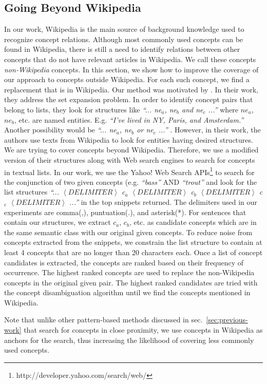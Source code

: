 
\subsection{Going Beyond Wikipedia}
\label{sec:impr-syst-cover}
In our work, Wikipedia is the main source of background knowledge used
to recognize concept relations. Although most commonly used concepts
can be found in Wikipedia, there is still a need to identify relations
between other concepts that do not have relevant articles in
Wikipedia. We call these concepts {\em non-Wikipedia} concepts.  In
this section, we show how to improve the coverage of our approach to
concepts outside Wikipedia. For each such concept, we find a
replacement that is in Wikipedia. Our method was motivated by
\cite{1321585}. In their work, they address the set expansion problem.
In order to identify concept pairs that belong to lists, they look for
structures like {\em ``... ne$_a$, ne$_b$ and ne$_c$ ...'' } where
$ne_a$, $ne_b$, etc. are named entities. E.g. {\em ``I've lived in NY,
  Paris, and Amsterdam.''} Another possibility would be {\em
  ``... ne$_a$, ne$_b$ or ne$_c$ ...'' }. However, in their work, the
authors use texts from Wikipedia to look for entities having desired
structures. We are trying to cover concepts beyond
Wikipedia. Therefore, we use a modified version of their structures
along with Web search engines to search for concepts in textual
lists. In our work, we use the Yahoo! Web Search
APIs\footnote{http://developer.yahoo.com/search/web/} to search for
the conjunction of two given concepts (e.g. {\em ``bass''} AND {\em
  ``trout''} and look for the list structures {\em ``... $\left <
    DELIMITER \right >$ c$_a$ $\left < DELIMITER \right >$ c$_b$
  $\left < DELIMITER \right >$ c$_c$ $\left < DELIMITER \right >$
  ...''} in the top snippets returned. The delimiters used in our
experiments are comma(,), puntuation(.), and asterisk(*). For
sentences that contain our structures, we extract $c_a$, $c_b$,
etc. as candidate concepts which are in the same semantic class with
our original given concepts. To reduce noise from concepts extracted
from the snippets, we constrain the list structure to contain at least
4 concepts that are no longer than 20 characters each. Once
a list of concept candidates is extracted, the concepts are ranked
based on their frequency of occurrence. The highest ranked concepts
are used to replace the non-Wikipedia concepts in the original given
pair. The highest ranked candidates are tried with the concept
disambiguation algorithm until we find the concepts mentioned in
Wikipedia.

Note that unlike other pattern-based methods discussed in
sec.~\ref{sec:previous-work} that search for concepts in close
proximity, we use concepts in Wikipedia as anchors for the
search, thus increasing the likelihood of covering less
commonly used concepts.


